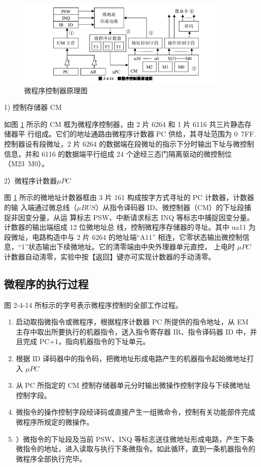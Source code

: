 \documentclass[a4paper,10pt,UTF8]{paper}
\numberwithin{equation}{section}
\numberwithin{figure}{section}
\begin{document}
\begin{figure}[h]
	\centering
	\includegraphics[width=0.9\textwidth]{2.PNG}
	\caption{微程序控制器原理图}
	\label{fig:2}
\end{figure}

1) 控制存储器 CM

如图 \ref{fig:2} 所示的 CM 框为微程序控制器，由 2 片 6264 和 1 片 6116 共三片静态存储器平
行组成。它们的地址通路由微程序计数器PC 供给，其寻址范围为 0~7FF.控制器设有段微址，2
片 6264 的数据端在段微址的指示下分时输出下址与微控制信息，并和 6116 的数据端平行组成
24 个途经三态门隔离驱动的微控制位（M23~M0）。

2）微程序计数器$\mu PC$

图 \ref{fig:2} 所示的微地址计数器框由 3 片 161 构成按字方式寻址的PC 计数器，计数器的输
入端通过微总线（$\mu BUS$）从指令译码器 ID、微控制器（CM）的下址段捕捉非因变分量，从运
算标志 PSW、中断请求标志 INQ 等标志中捕捉因变分量。计数器的输出端组成 12 位微地址总
线，控制微程序存储器的寻址。其中 ua11 为段微址，电路构造中与 2 片 6264 的地址端“A11”
相连，它零状态输出微控制信息，“1”状态输出下续微地址。它的清零端由中央外理器单元直控，
上电时 $\mu PC$ 计数器自动淸零，实验中按【返回】键亦可实现计数器的手动淸零。

\subsection{微程序的执行过程}

图 2-4-14 所标示的字号表示微程序控制的全部工作过程。

\begin{enumerate}
	\item 启动取指微指令或微程序，根据程序计数器 PC 所提供的指令地址，从 EM 主存中取出所要执行的机器指令，送入指令寄存器 IR、指令译码器 ID 中，并且完成 PC+1，指向机器指令的下址单元。
	\item 根据 ID 译码器中的指令码，把微地址形成电路产生的机器指令起始微地址打入 $\mu PC$
	\item 从PC 所指定的 CM 控制存储器单元分时输出微操作控制字段与下续微地址控制字段。
	\item 微指令的操作控制字段经译码或直接产生一组微命令，控制有关功能部件完成微程序所规定的微操作。
	\item ）微指令的下址段及当前 PSW、INQ 等标志送往微地址形成电路，产生下条微指令的地址，进入读取与执行下条微指令。如此循环，直到一条机器指令的微程序全部执行完毕。
\end{enumerate}
\end{document}
